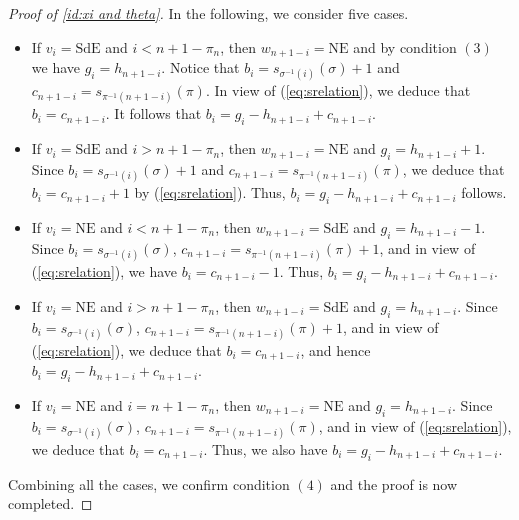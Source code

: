 \documentclass[12pt]{amsart}
\numberwithin{equation}{section}
\theoremstyle{plain}
\theoremstyle{definition}
\def\NE{\mathrm{NE}}
\def\SdE{\mathrm{SdE}}
\begin{document}
\begin{proof}[Proof of \eqref{id:xi and theta}]
In the following, we consider five cases.
\begin{itemize}
  \item [I.] If $v_i=\SdE$ and $i<n+1-\pi_n$, then $w_{n+1-i}=\NE$ and by condition $(3)$ we have $g_i=h_{n+1-i}$. Notice that $b_i=s_{\sigma^{-1}(i)}(\sigma)+1$ and  $c_{n+1-i}=s_{\pi^{-1}(n+1-i)}(\pi)$. In view of (\ref{eq:srelation}), we deduce that $b_i=c_{n+1-i}$.
      It follows that $b_i=g_i-h_{n+1-i}+c_{n+1-i}$.
      
  \item [II.]If $v_i=\SdE$ and $i>n+1-\pi_n$, then $w_{n+1-i}=\NE$ and $g_i=h_{n+1-i}+1$. Since $b_i=s_{\sigma^{-1}(i)}(\sigma)+1$ and  $c_{n+1-i}=s_{\pi^{-1}(n+1-i)}(\pi)$, we deduce that $b_i=c_{n+1-i}+1$ by (\ref{eq:srelation}). Thus,  $b_i=g_i-h_{n+1-i}+c_{n+1-i}$ follows.
      
  \item [III.]If $v_i=\NE$ and $i<n+1-\pi_n$, then $w_{n+1-i}=\SdE$ and  $g_i=h_{n+1-i}-1$. Since $b_i=s_{\sigma^{-1}(i)}(\sigma)$, $c_{n+1-i}=s_{\pi^{-1}(n+1-i)}(\pi)+1$, and in view of (\ref{eq:srelation}), we have $b_i=c_{n+1-i}-1$. Thus, $b_i=g_i-h_{n+1-i}+c_{n+1-i}$.
      
  \item [IV.]If $v_i=\NE$ and $i > n+1-\pi_n$, then $w_{n+1-i}=\SdE$  and  $g_i=h_{n+1-i}$. Since $b_i=s_{\sigma^{-1}(i)}(\sigma)$, $c_{n+1-i}=s_{\pi^{-1}(n+1-i)}(\pi)+1$, and in view of (\ref{eq:srelation}), we deduce that $b_i=c_{n+1-i}$, and hence $b_i=g_i-h_{n+1-i}+c_{n+1-i}$.
      
  \item [V.]If $v_i=\NE$ and $i = n+1-\pi_n$, then $w_{n+1-i}=\NE$  and  $g_i=h_{n+1-i}$. Since $b_i=s_{\sigma^{-1}(i)}(\sigma)$, $c_{n+1-i}=s_{\pi^{-1}(n+1-i)}(\pi)$, and in view of (\ref{eq:srelation}), we deduce that $b_i=c_{n+1-i}$. Thus, we also have $b_i=g_i-h_{n+1-i}+c_{n+1-i}$.
\end{itemize}
Combining all the cases, we confirm condition $(4)$ and the proof is now completed.
\end{proof}
\end{document}
